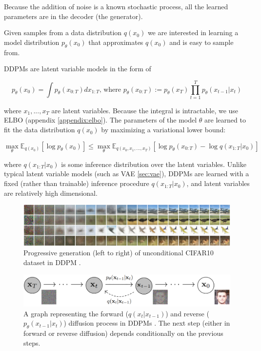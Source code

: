 Because the addition of noise is a known stochastic process, all the learned parameters are in the decoder (the generator).

Given samples from a data distribution $q(x_0)$ we are interested in learning a model distribution $p_\theta (x_0)$ that approximates $q(x_0)$ and is easy to sample from.

DDPMs are latent variable models in the form of 

\begin{equation}
    p_\theta (x_0) = \int p_\theta(x_{0:T}) dx_{1:T} \text{,\ \ where \ \ \ } p_\theta (x_{0:T}) := p_\theta (x_T) \prod_{t=1}^{T} p_\theta (x_{t-1} | x_t)
\end{equation}

where $x_1, ..., x_T$ are latent variables. Because the integral is intractable, we use ELBO (appendix \ref{appendix:elbo}). The parameters of the model $\theta$ are learned to fit the data distribution $q(x_0)$ by maximizing a variational lower bound:

\begin{equation}
    \max_{\theta} \mathbb{E}_{q(x_0)} [\log p_\theta (x_0)] \leq \max_\theta \mathbb{E}_{q(x_0, x_1, ..., x_T)} [\log p_\theta (x_{0:T}) - \log q(x_{1:T} | x_0)]
\end{equation}

where $q(x_{1:T} | x_0)$ is some inference distribution over the latent variables. Unlike typical latent variable models (such as VAE \ref{sec:vae}), DDPMs are learned with a fixed (rather than trainable) inference procedure $q(x_{1:T} | x_0)$, and latent variables are relatively high dimensional.


\begin{figure}
    \centering
    \includegraphics[width=1\textwidth]{images/diffusion_models/ddpm_denoise.png}
    \caption{Progressive generation (left to right) of unconditional CIFAR10 dataset in DDPM \cite{ddpm}.}
\end{figure}


\begin{figure}
    \centering
    \includegraphics[width=1\textwidth]{images/diffusion_models/ddpm_process.png}
    \caption{A graph representing the forward ($q(x_t | x_{t-1})$) and reverse ($p_\theta(x_{t-1} | x_t)$) diffusion process in DDPMs \cite{ddpm}. The next step (either in forward or reverse diffusion) depends conditionally on the previous steps.}
    \label{fig:ddpm_process}
\end{figure}






